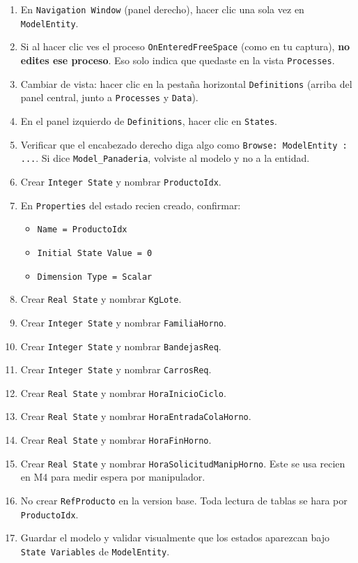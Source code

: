 \documentclass[11pt]{article}
\newcommand{\simio}[1]{\texttt{#1}}
\newcommand{\state}[1]{\texttt{#1}}
\begin{document}
\begin{enumerate}
  \item En \simio{Navigation Window} (panel derecho), hacer clic una sola vez en \simio{ModelEntity}.
  \item Si al hacer clic ves el proceso \simio{OnEnteredFreeSpace} (como en tu captura), \textbf{no edites ese proceso}. Eso solo indica que quedaste en la vista \simio{Processes}.
  \item Cambiar de vista: hacer clic en la pesta\~na horizontal \simio{Definitions} (arriba del panel central, junto a \simio{Processes} y \simio{Data}).
  \item En el panel izquierdo de \simio{Definitions}, hacer clic en \simio{States}.
  \item Verificar que el encabezado derecho diga algo como \simio{Browse: ModelEntity : ...}. Si dice \simio{Model\_Panaderia}, volviste al modelo y no a la entidad.
  \item Crear \simio{Integer State} y nombrar \state{ProductoIdx}.
  \item En \simio{Properties} del estado recien creado, confirmar:
    \begin{itemize}
      \item \simio{Name = ProductoIdx}
      \item \simio{Initial State Value = 0}
      \item \simio{Dimension Type = Scalar}
    \end{itemize}
  \item Crear \simio{Real State} y nombrar \state{KgLote}.
  \item Crear \simio{Integer State} y nombrar \state{FamiliaHorno}.
  \item Crear \simio{Integer State} y nombrar \state{BandejasReq}.
  \item Crear \simio{Integer State} y nombrar \state{CarrosReq}.
  \item Crear \simio{Real State} y nombrar \state{HoraInicioCiclo}.
  \item Crear \simio{Real State} y nombrar \state{HoraEntradaColaHorno}.
  \item Crear \simio{Real State} y nombrar \state{HoraFinHorno}.
  \item Crear \simio{Real State} y nombrar \state{HoraSolicitudManipHorno}. Este se usa recien en M4 para medir espera por manipulador.
  \item No crear \state{RefProducto} en la version base. Toda lectura de tablas se hara por \state{ProductoIdx}.
  \item Guardar el modelo y validar visualmente que los estados aparezcan bajo \simio{State Variables} de \simio{ModelEntity}.
\end{enumerate}
\end{document}

